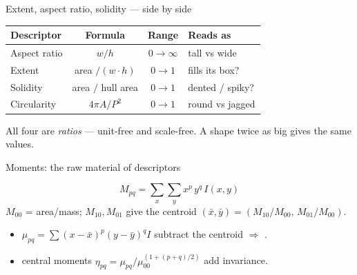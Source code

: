 \documentclass[10pt,aspectratio=169]{beamer}
\begin{document}
\begin{frame}{Extent, aspect ratio, solidity — side by side}
  \begin{center}\scriptsize
  \begin{tabular}{@{}lccl@{}}
    \toprule
    \textbf{Descriptor} & \textbf{Formula} & \textbf{Range} & \textbf{Reads as}\\
    \midrule
    Aspect ratio & $w/h$ & $0\!\to\!\infty$ & tall vs wide \\
    Extent & area $/(w\cdot h)$ & $0\!\to\!1$ & fills its box? \\
    Solidity & area $/$ hull area & $0\!\to\!1$ & dented / spiky? \\
    Circularity & $4\pi A/P^2$ & $0\!\to\!1$ & round vs jagged \\
    \bottomrule
  \end{tabular}
  \end{center}
  \begin{goodbox}
    All four are \emph{ratios} — unit-free and scale-free. A shape twice as big gives the same values.
  \end{goodbox}
\end{frame}

\begin{frame}{Moments: the raw material of descriptors}
  \begin{mathbox}
    \[ M_{pq}=\sum_{x}\sum_{y} x^{p}\,y^{q}\,I(x,y) \]
    $M_{00}$ = area/mass; $M_{10},M_{01}$ give the centroid $(\bar x,\bar y)=(M_{10}/M_{00},\,M_{01}/M_{00})$.
  \end{mathbox}
  \begin{itemize}
    \item {} $\mu_{pq}=\sum (x-\bar x)^p (y-\bar y)^q I$ subtract the centroid $\Rightarrow$ .
    \item {} central moments $\eta_{pq}=\mu_{pq}/\mu_{00}^{(1+(p+q)/2)}$ add  invariance.
  \end{itemize}
\end{frame}
\end{document}
